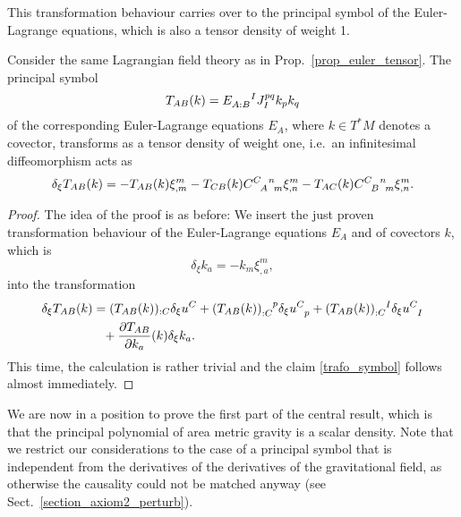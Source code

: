 This transformation behaviour carries over to the principal symbol of the Euler-Lagrange equations, which is also a tensor density of weight 1.
\begin{proposition}
  Consider the same Lagrangian field theory as in Prop.~\ref{prop_euler_tensor}. The principal symbol
  \begin{equation}\label{trafo_symbol}
    T_{AB}(k) = E_{A:B}^{\hphantom{A:B}I} J_I^{pq} k_p k_q
  \end{equation}
  of the corresponding Euler-Lagrange equations $E_A$, where $k \in T^\ast M$ denotes a covector, transforms as a tensor density of weight one, i.e.~an infinitesimal diffeomorphism acts as
  \begin{equation}
    \delta_\xi T_{AB}(k) = - T_{AB}(k) \xi^m_{,m} - T_{CB}(k) \gmc{C}{A}{n}{m} \xi^m_{,n} - T_{AC}(k) \gmc{C}{B}{n}{m} \xi^m_{,n}.
  \end{equation}
\end{proposition}
\begin{proof}
  The idea of the proof is as before: We insert the just proven transformation behaviour of the Euler-Lagrange equations $E_A$ and of covectors $k$, which is
  \begin{equation}
    \delta_\xi k_a = - k_m \xi^m_{,a},
  \end{equation}
  into the transformation
  \begin{equation}
    \begin{aligned}
      \delta_\xi T_{AB}(k) &{} = (T_{AB}(k))_{:C} \delta_\xi u^C + (T_{AB}(k))_{:C}^{\hphantom{:C}p} \delta_\xi u^C_{\hphantom Cp} + (T_{AB}(k))_{:C}^{\hphantom{:C}I} \delta_\xi u^C_{\hphantom CI} \\
                           &{} \hphantom{=} + \frac{\partial T_{AB}}{\partial k_a}(k) \delta_\xi k_a.
    \end{aligned}
  \end{equation}
  This time, the calculation is rather trivial and the claim \eqref{trafo_symbol} follows almost immediately.
\end{proof}
We are now in a position to prove the first part of the central result, which is that the principal polynomial of area metric gravity is a scalar density. Note that we restrict our considerations to the case of a principal symbol that is independent from the derivatives of the derivatives of the gravitational field, as otherwise the causality could not be matched anyway (see Sect.~\ref{section_axiom2_perturb}).
